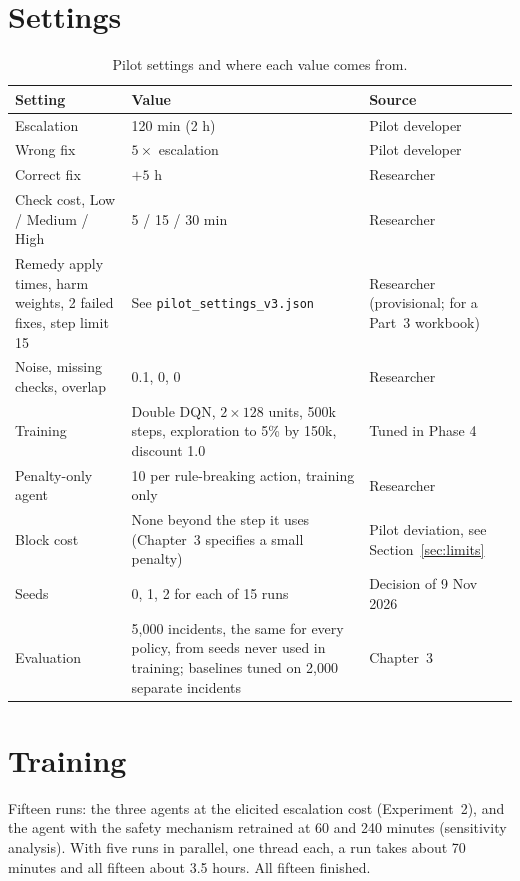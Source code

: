 \documentclass[11pt,a4paper]{article}
\newcommand{\file}[1]{\texttt{\small #1}}
\begin{document}
\section{Settings}

\begin{table}[H]
\centering\small
\caption{Pilot settings and where each value comes from.}
\begin{tabularx}{\linewidth}{@{}p{4.4cm}Lp{3.6cm}@{}}
\toprule
Setting & Value & Source \\
\midrule
Escalation & 120 min (2 h) & Pilot developer \\
Wrong fix & $5\times$ escalation & Pilot developer \\
Correct fix & $+5$ h & Researcher \\
Check cost, Low / Medium / High & 5 / 15 / 30 min & Researcher \\
Remedy apply times, harm weights, 2 failed fixes, step limit 15 & See \file{pilot\_settings\_v3.json} & Researcher (provisional; for a Part~3 workbook) \\
Noise, missing checks, overlap & 0.1, 0, 0 & Researcher \\
Training & Double DQN, $2\times128$ units, 500k steps, exploration to 5\% by 150k, discount 1.0 & Tuned in Phase 4 \\
Penalty-only agent & 10 per rule-breaking action, training only & Researcher \\
Block cost & None beyond the step it uses (Chapter~3 specifies a small penalty) & Pilot deviation, see Section~\ref{sec:limits} \\
Seeds & 0, 1, 2 for each of 15 runs & Decision of 9 Nov 2026 \\
Evaluation & 5,000 incidents, the same for every policy, from seeds never used in training; baselines tuned on 2,000 separate incidents & Chapter~3 \\
\bottomrule
\end{tabularx}
\end{table}

\section{Training}\label{sec:training}

Fifteen runs: the three agents at the elicited escalation cost (Experiment~2), and the agent with the safety mechanism retrained at 60 and 240 minutes (sensitivity analysis). With five runs in parallel, one thread each, a run takes about 70 minutes and all fifteen about 3.5 hours. All fifteen finished.
\end{document}
